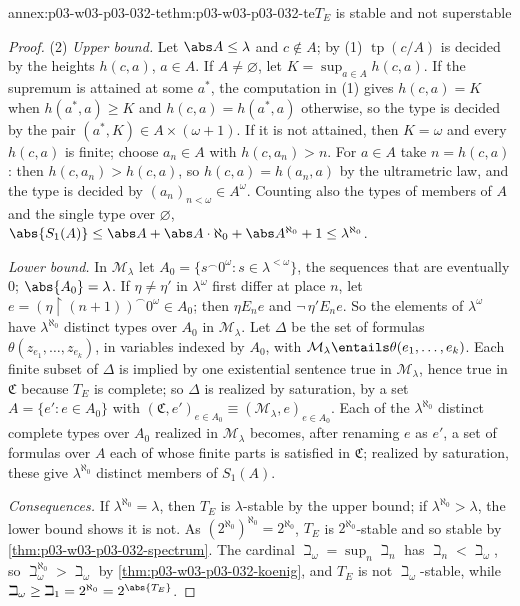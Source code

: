 \begin{annexitem}{annex:p03-w03-p03-032-te}{thm:p03-w03-p03-032-te}{\(T_E\) is stable and not superstable}
\begin{proof}
(2) \emph{Upper bound.}  Let \(\abs A\leq\lambda\) and \(c\notin A\); by (1)
\(\operatorname{tp}(c/A)\) is decided by the heights \(h(c,a)\),
\(a\in A\).  If \(A\neq\varnothing\), let \(K=\sup_{a\in A}h(c,a)\).  If the
supremum is attained at some \(a^*\), the computation in (1) gives
\(h(c,a)=K\) when \(h(a^*,a)\geq K\) and \(h(c,a)=h(a^*,a)\) otherwise, so
the type is decided by the pair \((a^*,K)\in A\times(\omega+1)\).  If it is
not attained, then \(K=\omega\) and every \(h(c,a)\) is finite; choose
\(a_n\in A\) with \(h(c,a_n)>n\).  For \(a\in A\) take \(n=h(c,a)\): then
\(h(c,a_n)>h(c,a)\), so \(h(c,a)=h(a_n,a)\) by the ultrametric law, and the
type is decided by \((a_n)_{n<\omega}\in A^\omega\).  Counting also the
types of members of \(A\) and the single type over \(\varnothing\),
\(\abs{S_1(A)}\leq\abs A+\abs A\cdot\aleph_0+\abs A^{\aleph_0}+1
\leq\lambda^{\aleph_0}\).

\emph{Lower bound.}  In \(\mathcal M_\lambda\) let
\(A_0=\{s^\frown0^\omega:s\in\lambda^{<\omega}\}\), the sequences that are
eventually \(0\); \(\abs{A_0}=\lambda\).  If \(\eta\neq\eta'\) in
\(\lambda^\omega\) first differ at place \(n\), let
\(e=(\eta\mathbin{\upharpoonright}(n+1))^\frown0^\omega\in A_0\); then
\(\eta\mathrel{E_n}e\) and \(\neg\,\eta'\mathrel{E_n}e\).  So the elements of
\(\lambda^\omega\) have \(\lambda^{\aleph_0}\) distinct types over \(A_0\) in
\(\mathcal M_\lambda\).  Let \(\Delta\) be the set of formulas
\(\theta(z_{e_1},\ldots,z_{e_k})\), in variables indexed by \(A_0\), with
\(\mathcal M_\lambda\entails\theta(e_1,\ldots,e_k)\).  Each finite subset of
\(\Delta\) is implied by one existential sentence true in
\(\mathcal M_\lambda\), hence true in \(\mathfrak C\) because \(T_E\) is
complete; so \(\Delta\) is realized by saturation, by a set
\(A=\{e':e\in A_0\}\) with \((\mathfrak C,e')_{e\in A_0}\equiv
(\mathcal M_\lambda,e)_{e\in A_0}\).  Each of the \(\lambda^{\aleph_0}\)
distinct complete types over \(A_0\) realized in \(\mathcal M_\lambda\)
becomes, after renaming \(e\) as \(e'\), a set of formulas over \(A\) each of
whose finite parts is satisfied in \(\mathfrak C\); realized by saturation,
these give \(\lambda^{\aleph_0}\) distinct members of \(S_1(A)\).

\emph{Consequences.}  If \(\lambda^{\aleph_0}=\lambda\), then
\(T_E\) is \(\lambda\)-stable by the upper bound; if
\(\lambda^{\aleph_0}>\lambda\), the lower bound shows it is not.  As
\((2^{\aleph_0})^{\aleph_0}=2^{\aleph_0}\), \(T_E\) is
\(2^{\aleph_0}\)-stable and so stable by
\cref{thm:p03-w03-p03-032-spectrum}.  The cardinal
\(\beth_\omega=\sup_n\beth_n\) has \(\beth_n<\beth_\omega\), so
\(\beth_\omega^{\aleph_0}>\beth_\omega\) by
\cref{thm:p03-w03-p03-032-koenig}, and \(T_E\) is not
\(\beth_\omega\)-stable, while \(\beth_\omega\geq\beth_1=2^{\aleph_0}
=2^{\abs{T_E}}\).


\end{proof}
\end{annexitem}
